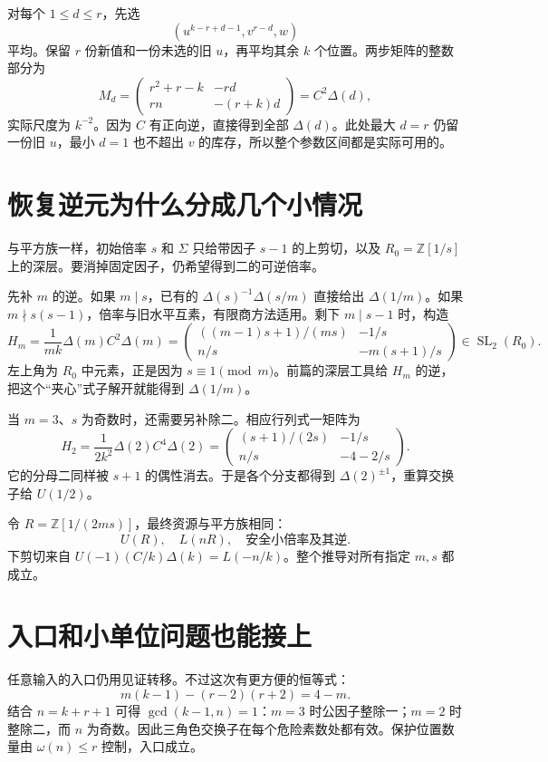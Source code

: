 \documentclass[11pt,a4paper,oneside,openany]{book}
\newcommand{\Z}{\mathbb Z}\newcommand{\Q}{\mathbb Q}\newcommand{\F}{\mathbb F}\newcommand{\CC}{\mathbb C}
\newcommand{\SL}{\operatorname{SL}}\newcommand{\GL}{\operatorname{GL}}
\theoremstyle{definition}\newtheorem{example}[theorem]{例}\newtheorem{conjecture}[theorem]{猜想}
\numberwithin{equation}{chapter}\setcounter{tocdepth}{1}
\begin{document}
对每个 $1\le d\le r$，先选
\[(u^{k-r+d-1},v^{r-d},w)
\]
平均。保留 $r$ 份新值和一份未选的旧 $u$，再平均其余 $k$ 个位置。两步矩阵的整数部分为
\[
M_d=\begin{pmatrix}
r^2+r-k&-rd\\rn&-(r+k)d
\end{pmatrix}=C^2\Delta(d),
\]
实际尺度为 $k^{-2}$。因为 $C$ 有正向逆，直接得到全部 $\Delta(d)$。此处最大 $d=r$ 仍留一份旧 $u$，最小 $d=1$ 也不超出 $v$ 的库存，所以整个参数区间都是实际可用的。

\section{恢复逆元为什么分成几个小情况}
与平方族一样，初始倍率 $s$ 和 $\Sigma$ 只给带因子 $s-1$ 的上剪切，以及 $R_0=\Z[1/s]$ 上的深层。要消掉固定因子，仍希望得到二的可逆倍率。

先补 $m$ 的逆。如果 $m\mid s$，已有的 $\Delta(s)^{-1}\Delta(s/m)$ 直接给出 $\Delta(1/m)$。如果 $m\nmid s(s-1)$，倍率与旧水平互素，有限商方法适用。剩下 $m\mid s-1$ 时，构造
\[
H_m=\frac1{mk}\Delta(m)C^2\Delta(m)
=\begin{pmatrix}
((m-1)s+1)/(ms)&-1/s\\
n/s&-m(s+1)/s
\end{pmatrix}\in\SL_2(R_0).
\]
左上角为 $R_0$ 中元素，正是因为 $s\equiv1\pmod m$。前篇的深层工具给 $H_m$ 的逆，把这个“夹心”式子解开就能得到 $\Delta(1/m)$。

当 $m=3$、$s$ 为奇数时，还需要另补除二。相应行列式一矩阵为
\[
H_2=\frac1{2k^2}\Delta(2)C^4\Delta(2)
=\begin{pmatrix}
(s+1)/(2s)&-1/s\\n/s&-4-2/s
\end{pmatrix}.
\]
它的分母二同样被 $s+1$ 的偶性消去。于是各个分支都得到 $\Delta(2)^{\pm1}$，重算交换子给 $U(1/2)$。

令 $R=\Z[1/(2ms)]$，最终资源与平方族相同：
\[U(R),\quad L(nR),\quad\text{安全小倍率及其逆}.
\]
下剪切来自 $U(-1)(C/k)\Delta(k)=L(-n/k)$。整个推导对所有指定 $m,s$ 都成立。

\section{入口和小单位问题也能接上}
任意输入的入口仍用见证转移。不过这次有更方便的恒等式：
\[m(k-1)-(r-2)(r+2)=4-m.
\]
结合 $n=k+r+1$ 可得 $\gcd(k-1,n)=1$：$m=3$ 时公因子整除一；$m=2$ 时整除二，而 $n$ 为奇数。因此三角色交换子在每个危险素数处都有效。保护位置数量由 $\omega(n)\le r$ 控制，入口成立。
\end{document}
